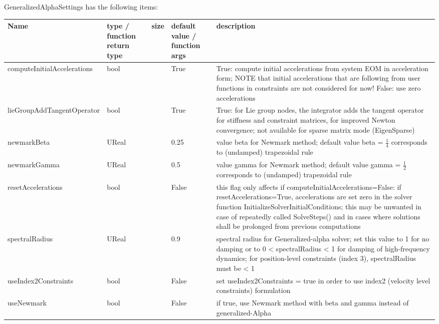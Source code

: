 \noindent GeneralizedAlphaSettings has the following items:
\begin{center}
  \footnotesize
  \begin{longtable}{| p{4.2cm} | p{2.5cm} | p{0.3cm} | p{3.0cm} | p{6cm} |}
    \hline
    \bf Name & \bf type / function return type & \bf size & \bf default value / function args & \bf description \\ \hline
    computeInitialAccelerations &     bool &      &     True &     True: compute initial accelerations from system EOM in acceleration form; NOTE that initial accelerations that are following from user functions in constraints are not considered for now! False: use zero accelerations\\ \hline
    lieGroupAddTangentOperator &     bool &      &     True &     True: for Lie group nodes, the integrator adds the tangent operator for stiffness and constraint matrices, for improved Newton convergence; not available for sparse matrix mode (EigenSparse)\\ \hline
    newmarkBeta &     UReal &      &     0.25 &     value beta for Newmark method; default value beta = $\frac 1 4$ corresponds to (undamped) trapezoidal rule\\ \hline
    newmarkGamma &     UReal &      &     0.5 &     value gamma for Newmark method; default value gamma = $\frac 1 2$ corresponds to (undamped) trapezoidal rule\\ \hline
    resetAccelerations &     bool &      &     False &     this flag only affects if computeInitialAccelerations=False: if resetAccelerations=True, accelerations are set zero in the solver function InitializeSolverInitialConditions; this may be unwanted in case of repeatedly called SolveSteps() and in cases where solutions shall be prolonged from previous computations\\ \hline
    spectralRadius &     UReal &      &     0.9 &     spectral radius for Generalized-alpha solver; set this value to 1 for no damping or to 0 < spectralRadius < 1 for damping of high-frequency dynamics; for position-level constraints (index 3), spectralRadius must be < 1\\ \hline
    useIndex2Constraints &     bool &      &     False &     set useIndex2Constraints = true in order to use index2 (velocity level constraints) formulation\\ \hline
    useNewmark &     bool &      &     False &     if true, use Newmark method with beta and gamma instead of generalized-Alpha\\ \hline
	  \end{longtable}
	\end{center}


